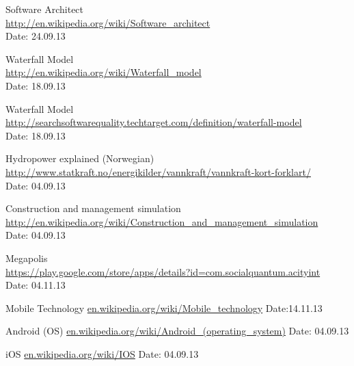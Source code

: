\begin{thebibliography}{99}
	Software Architect \\
	\href{http://en.wikipedia.org/wiki/Software_architect}{http://en.wikipedia.org/wiki/Software\_architect} \\
	Date: 24.09.13

	Waterfall Model \\
	\href {http://en.wikipedia.org/wiki/Waterfall_model}{http://en.wikipedia.org/wiki/Waterfall\_model} \\
	Date: 18.09.13

	Waterfall Model \\
	\href {http://searchsoftwarequality.techtarget.com/definition/waterfall-model}{http://searchsoftwarequality.techtarget.com/definition/waterfall-model} \\
	Date: 18.09.13

	Hydropower explained (Norwegian) \\
	\href {http://www.statkraft.no/energikilder/vannkraft/vannkraft-kort-forklart/}{http://www.statkraft.no/energikilder/vannkraft/vannkraft-kort-forklart/} \\
	Date: 04.09.13

	Construction and management simulation \\
	\href {http://en.wikipedia.org/wiki/Construction_and_management_simulation}{http://en.wikipedia.org/wiki/Construction\_and\_management\_simulation} \\
	Date: 04.09.13

	Megapolis \\
	\href {https://play.google.com/store/apps/details?id=com.socialquantum.acityint}{https://play.google.com/store/apps/details?id=com.socialquantum.acityint} \\
	Date: 04.11.13

	Mobile Technology\newline
	\href{http://en.wikipedia.org/wiki/Mobile_technology}{en.wikipedia.org/wiki/Mobile\_technology}\newline
	Date:14.11.13

	Android (OS)\newline
	\href {http://en.wikipedia.org/wiki/Android\_(operating_system)}{en.wikipedia.org/wiki/Android\_(operating\_system)}\newline
	Date: 04.09.13

	iOS\newline
	\href {http://en.wikipedia.org/wiki/IOS}{en.wikipedia.org/wiki/IOS}\newline
	Date: 04.09.13


\end{thebibliography}
